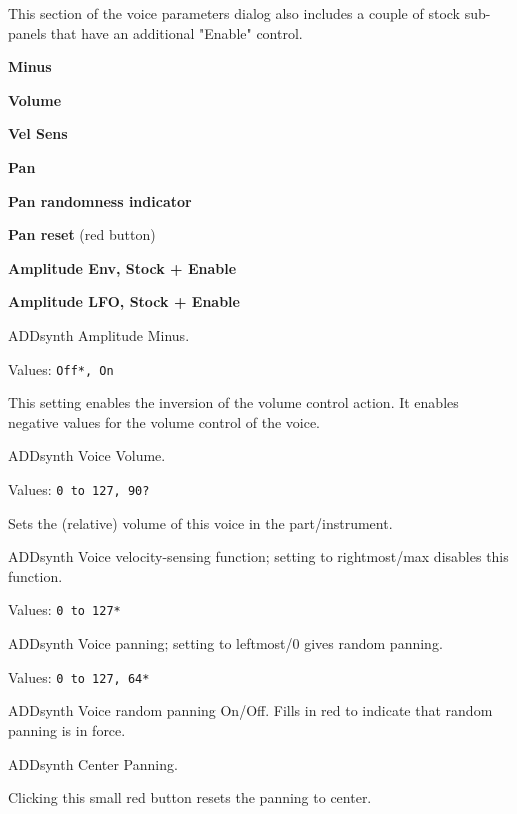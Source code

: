    This section of the voice parameters dialog also includes a couple of
   stock sub-panels that have an additional "Enable" control.

   \begin{enumber}
      \item \textbf{Minus}
      \item \textbf{Volume}
      \item \textbf{Vel Sens}
      \item \textbf{Pan}
      \item \textbf{Pan randomness indicator}
      \item \textbf{Pan reset} (red button)
      \item \textbf{Amplitude Env, Stock + Enable}
      \item \textbf{Amplitude LFO, Stock + Enable}
   \end{enumber}

   \setcounter{ItemCounter}{0}      %

   ADDsynth Amplitude Minus.

   Values: \texttt{Off*, On}

   This setting enables the inversion of the volume control action.
   It enables negative values for the volume control of the voice.

   ADDsynth Voice Volume.

   Values: \texttt{0 to 127, 90?}

   Sets the (relative) volume of this voice in the part/instrument.

   ADDsynth Voice velocity-sensing function; setting to rightmost/max
   disables this function.

   Values: \texttt{0 to 127*}

   ADDsynth Voice panning; setting to leftmost/0 gives random panning.

   Values: \texttt{0 to 127, 64*}

   ADDsynth Voice random panning On/Off.
   Fills in red to indicate that random panning is in force.

   ADDsynth Center Panning.

   Clicking this small red button resets the panning to center.

